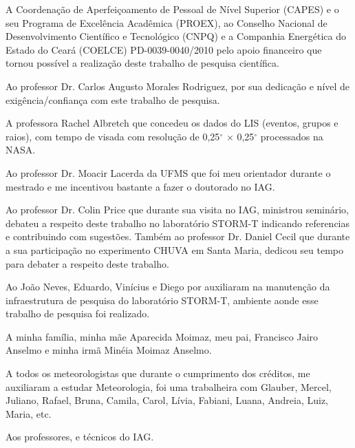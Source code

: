 \documentclass[12pt,a4paper,tocpage=plain,floatnumber=continuous,chapter=TITLE,appendix=nobox,font=plain, header=ruled,hyperindex=false]{abnt}
\begin{document}

A Coordenação de Aperfeiçoamento de Pessoal de Nível Superior (CAPES) e o seu Programa de Excelência Acadêmica (PROEX), ao Conselho Nacional de Desenvolvimento Científico e Tecnológico (CNPQ) e a Companhia Energética do Estado do Ceará (COELCE) PD-0039-0040/2010 pelo apoio financeiro que tornou possível a realização deste trabalho de pesquisa científica.

Ao professor Dr. Carlos Augusto Morales Rodriguez, por sua dedicação e nível de exigência/confiança com este trabalho de pesquisa. 

A professora Rachel Albretch que concedeu os dados do LIS (eventos, grupos e raios), com tempo de visada com resolução de 0,25$^{\circ}$ $\times$ 0,25$^{\circ}$ processados na NASA.

Ao professor Dr. Moacir Lacerda da UFMS que foi meu orientador durante o mestrado e me incentivou bastante a fazer o doutorado no IAG.

Ao professor Dr. Colin Price que durante sua visita no IAG, ministrou seminário, debateu a respeito deste trabalho no laboratório STORM-T indicando referencias e contribuindo com sugestões. Também ao professor Dr. Daniel Cecil que durante a sua participação no experimento CHUVA em Santa Maria, dedicou seu tempo para debater a respeito deste trabalho.   

Ao João Neves, Eduardo, Vinícius e Diego por auxiliaram na manutenção da infraestrutura de pesquisa do laboratório STORM-T, ambiente aonde esse trabalho de pesquisa foi realizado.

A minha família, minha mãe Aparecida Moimaz, meu pai, Francisco Jairo Anselmo e minha irmã Minéia Moimaz Anselmo. 

A todos os meteorologistas que durante o cumprimento dos créditos, me auxiliaram a estudar Meteorologia, foi uma trabalheira com  Glauber, Mercel, Juliano, Rafael, Bruna, Camila, Carol, Lívia, Fabiani, Luana, Andreia, Luiz, Maria, etc.

Aos professores, e técnicos do IAG.
\end{document}
